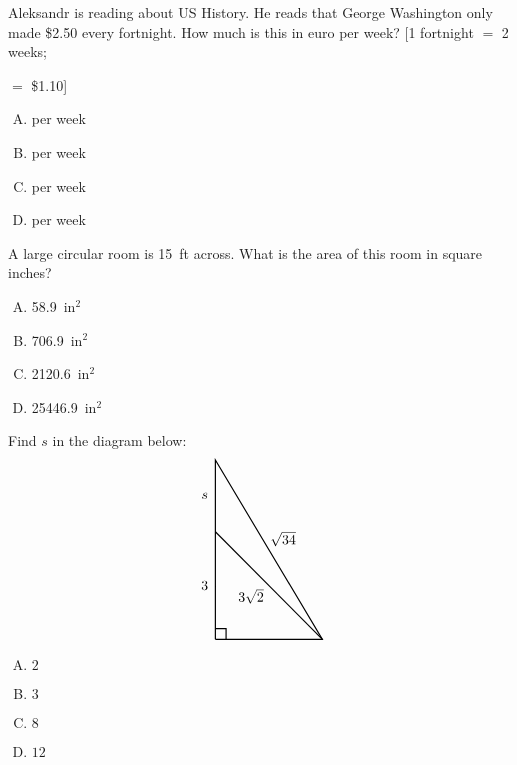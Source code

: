 \documentclass[12pt,letterpaper]{exam}
\begin{document}
\begin{questions}
\newpage



\question Aleksandr is reading about US History. He reads that George Washington only made \$2.50 every fortnight. How much is this in euro per week? [1 fortnight $=$ 2 weeks; \par {} $=$ \$1.10]
        \begin{enumerate}[A.]
        \item {} per week %
        \item {} per week
        \item {} per week
        \item {} per week 
        \end{enumerate}



\vfill



\question A large circular room is 15~ft across. What is the area of this room in square inches?
        \begin{enumerate}[A.]
        \item 58.9~in$^2$ %
        \item 706.9~in$^2$
        \item 2120.6~in$^2$
        \item 25446.9~in$^2$
        \end{enumerate}



\vfill



\question Find $s$ in the diagram below:
	\[
	\begin{tikzpicture}[scale=0.9]
	\draw[line width=0.03cm] (0,0) -- (0,5) -- (3,0) -- (0,0);
	\draw[line width=0.03cm] (0,0.3) -- (0.3,0.3) -- (0.3,0);
	\draw[line width=0.03cm] (3,0) -- (0,3);
	\node at (-0.3,1.5) {$3$};
	\node at (1.9,2.8) {$\sqrt{34}$};
	\node at (1,1.2) {$3\sqrt{2}$};
	\node at (-0.3,4.0) {$s$};
	\end{tikzpicture}
	\]

\begin{enumerate}[A.]
\item $2$
\item $3$
\item $8$ %
\item $12$
\end{enumerate}




\end{questions}
\end{document}
